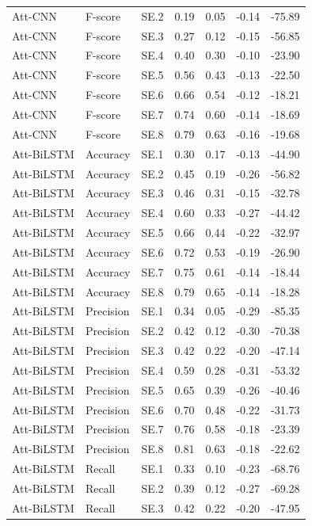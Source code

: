 \begin{tabular}{lllrrrr}
Att-CNN & F-score & SE.2 & 0.19 & 0.05 & -0.14 & -75.89 \\
Att-CNN & F-score & SE.3 & 0.27 & 0.12 & -0.15 & -56.85 \\
Att-CNN & F-score & SE.4 & 0.40 & 0.30 & -0.10 & -23.90 \\
Att-CNN & F-score & SE.5 & 0.56 & 0.43 & -0.13 & -22.50 \\
Att-CNN & F-score & SE.6 & 0.66 & 0.54 & -0.12 & -18.21 \\
Att-CNN & F-score & SE.7 & 0.74 & 0.60 & -0.14 & -18.69 \\
Att-CNN & F-score & SE.8 & 0.79 & 0.63 & -0.16 & -19.68 \\
Att-BiLSTM & Accuracy & SE.1 & 0.30 & 0.17 & -0.13 & -44.90 \\
Att-BiLSTM & Accuracy & SE.2 & 0.45 & 0.19 & -0.26 & -56.82 \\
Att-BiLSTM & Accuracy & SE.3 & 0.46 & 0.31 & -0.15 & -32.78 \\
Att-BiLSTM & Accuracy & SE.4 & 0.60 & 0.33 & -0.27 & -44.42 \\
Att-BiLSTM & Accuracy & SE.5 & 0.66 & 0.44 & -0.22 & -32.97 \\
Att-BiLSTM & Accuracy & SE.6 & 0.72 & 0.53 & -0.19 & -26.90 \\
Att-BiLSTM & Accuracy & SE.7 & 0.75 & 0.61 & -0.14 & -18.44 \\
Att-BiLSTM & Accuracy & SE.8 & 0.79 & 0.65 & -0.14 & -18.28 \\
Att-BiLSTM & Precision & SE.1 & 0.34 & 0.05 & -0.29 & -85.35 \\
Att-BiLSTM & Precision & SE.2 & 0.42 & 0.12 & -0.30 & -70.38 \\
Att-BiLSTM & Precision & SE.3 & 0.42 & 0.22 & -0.20 & -47.14 \\
Att-BiLSTM & Precision & SE.4 & 0.59 & 0.28 & -0.31 & -53.32 \\
Att-BiLSTM & Precision & SE.5 & 0.65 & 0.39 & -0.26 & -40.46 \\
Att-BiLSTM & Precision & SE.6 & 0.70 & 0.48 & -0.22 & -31.73 \\
Att-BiLSTM & Precision & SE.7 & 0.76 & 0.58 & -0.18 & -23.39 \\
Att-BiLSTM & Precision & SE.8 & 0.81 & 0.63 & -0.18 & -22.62 \\
Att-BiLSTM & Recall & SE.1 & 0.33 & 0.10 & -0.23 & -68.76 \\
Att-BiLSTM & Recall & SE.2 & 0.39 & 0.12 & -0.27 & -69.28 \\
Att-BiLSTM & Recall & SE.3 & 0.42 & 0.22 & -0.20 & -47.95 \\

\end{tabular}
